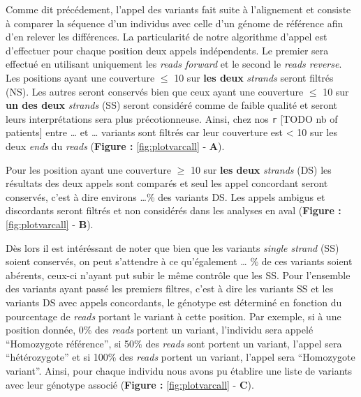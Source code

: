 \documentclass[12pt,twoside]{reedthesis}
\theoremstyle{definition}
\theoremstyle{definition}
\theoremstyle{remark}
\begin{document}
  Comme dit précédement, l'appel des variants fait suite à l'alignement et
  consiste à comparer la séquence d'un individus avec celle d'un génome de
  référence afin d'en relever les différences. La particularité de notre
  algorithme d'appel est d'effectuer pour chaque position deux appels
  indépendents. Le premier sera effectué en utilisant uniquement les
  \emph{reads forward} et le second le \emph{reads reverse}. Les positions
  ayant une couverture \(\le\) 10 sur \textbf{les deux} \emph{strands}
  seront filtrés (NS). Les autres seront conservés bien que ceux ayant une
  couverture \(\le\) 10 sur \textbf{un des deux} \emph{strands} (SS)
  seront considéré comme de faible qualité et seront leurs interprétations
  sera plus précotionneuse. Ainsi, chez nos \texttt{r} {[}TODO nb of
  patients{]} entre \ldots{} et \ldots{} variants sont filtrés car leur
  couverture est \textless{} 10 sur les deux \emph{ends} du \emph{reads}
  (\textbf{Figure : }\ref{fig:plotvarcall} - \textbf{A}).
  
  Pour les position ayant une couverture \(\ge\) 10 sur \textbf{les deux}
  \emph{strands} (DS) les résultats des deux appels sont comparés et seul
  les appel concordant seront conservés, c'est à dire environs \ldots{}\%
  des variants DS. Les appels ambigus et discordants seront filtrés et non
  considérés dans les analyses en aval (\textbf{Figure :
  }\ref{fig:plotvarcall} - \textbf{B}).
  
  Dès lors il est intéréssant de noter que bien que les variants
  \emph{single strand} (SS) soient conservés, on peut s'attendre à ce
  qu'également \ldots{} \% de ces variants soient abérents, ceux-ci
  n'ayant put subir le même contrôle que les SS. Pour l'ensemble des
  variants ayant passé les premiers filtres, c'est à dire les variants SS
  et les variants DS avec appels concordants, le génotype est déterminé en
  fonction du pourcentage de \emph{reads} portant le variant à cette
  position. Par exemple, si à une position donnée, 0\% des \emph{reads}
  portent un variant, l'individu sera appelé ``Homozygote référence'', si
  50\% des \emph{reads} sont portent un variant, l'appel sera
  ``hétérozygote'' et si 100\% des \emph{reads} portent un variant,
  l'appel sera ``Homozygote variant''. Ainsi, pour chaque individu nous
  avons pu établire une liste de variants avec leur génotype associé
  (\textbf{Figure : }\ref{fig:plotvarcall} - \textbf{C}).
  
  \newpage
  
\end{document}
